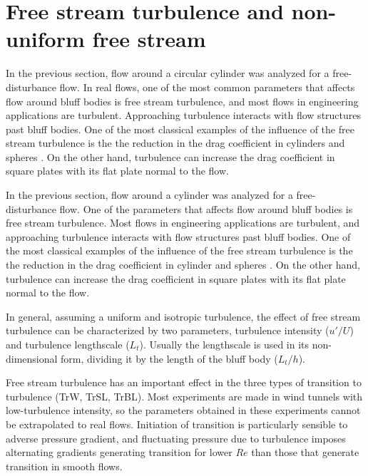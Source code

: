 \documentclass[journal]{new-aiaa}
\begin{document}
\section{Free stream turbulence and non-uniform free stream}


In the previous section, flow around a circular cylinder was analyzed for a free-disturbance flow. In real flows, one of the most common parameters that affects flow around bluff bodies is free stream turbulence, and most flows in engineering applications are turbulent. Approaching turbulence interacts with flow structures past bluff bodies. One of the most classical examples of the influence of the free stream turbulence is the the reduction in the drag coefficient in cylinders and spheres \cite{Nakamura1988}. On the other hand, turbulence can increase the drag coefficient in square plates with its flat plate normal to the flow. 

In the previous section, flow around a cylinder was analyzed for a free-disturbance flow. One of the parameters that affects flow around bluff bodies is free stream turbulence. Most flows in engineering applications are turbulent, and approaching turbulence interacts with flow structures past bluff bodies. One of the most classical examples of the influence of the free stream turbulence is the the reduction in the drag coefficient in cylinder and spheres \cite{Nakamura1988}. On the other hand, turbulence can increase the drag coefficient in square plates with its flat plate normal to the flow.


In general, assuming a uniform and isotropic turbulence, the effect of free stream turbulence can be characterized by two parameters, turbulence intensity ($u'/U$) and turbulence lengthscale ($L_t$). Usually the lengthscale is used in its non-dimensional form, dividing it by the length of the bluff body ($L_t/h$).


Free stream turbulence has an important effect in the three types of transition to turbulence (TrW, TrSL, TrBL). Most experiments are made in wind tunnels with low-turbulence intensity, so the parameters obtained in these experiments cannot be extrapolated to real flows. Initiation of transition is particularly sensible to adverse pressure gradient, and fluctuating pressure due to turbulence imposes alternating gradients generating transition for lower $Re$ than those that generate transition in smooth flows.  
\end{document}
